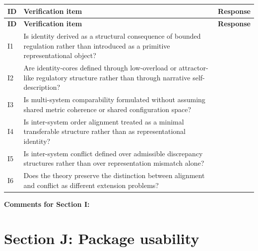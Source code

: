 \documentclass[11pt,a4paper]{article}
\begin{document}
	\begin{longtable}{>{\RaggedRight\arraybackslash}p{}
			>{\RaggedRight\arraybackslash}p{}
			>{\RaggedRight\arraybackslash}p{}}
		\toprule
		\textbf{ID} & \textbf{Verification item} & \textbf{Response} \\
		\midrule
		\endfirsthead
		\toprule
		\textbf{ID} & \textbf{Verification item} & \textbf{Response} \\
		\midrule
		\endhead
		
		I1 & Is identity derived as a structural consequence of bounded regulation rather than introduced as a primitive representational object? & \\
		
		I2 & Are identity-cores defined through low-overload or attractor-like regulatory structure rather than through narrative self-description? & \\
		
		I3 & Is multi-system comparability formulated without assuming shared metric coherence or shared configuration space? & \\
		
		I4 & Is inter-system order alignment treated as a minimal transferable structure rather than as representational identity? & \\
		
		I5 & Is inter-system conflict defined over admissible discrepancy structures rather than over representation mismatch alone? & \\
		
		I6 & Does the theory preserve the distinction between alignment and conflict as different extension problems? & \\
		
		\bottomrule
	\end{longtable}
	
	\textbf{Comments for Section I:}
	
	\vspace{3em}
	
	\section{Section J: Package usability}
	
\end{document}
